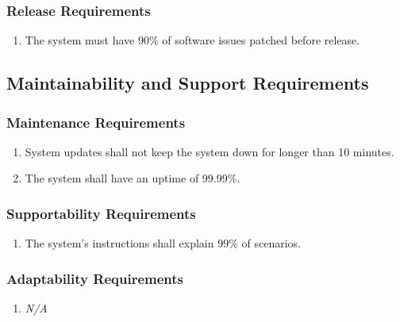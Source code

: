 \documentclass{article}
\begin{document}
\subsubsection{Release Requirements}
\label{ssub:release_requirements}
\begin{enumerate}[{OE}1. ]
	\item The system must have 90\% of software issues patched before release.
\end{enumerate}


\subsection{Maintainability and Support Requirements}
\label{sub:maintainability_and_support_requirements}

\subsubsection{Maintenance Requirements}
\label{ssub:maintenance_requirements}
\begin{enumerate}[{MS}1. ]
	\item System updates shall not keep the system down for longer than 10 minutes.
	\item The system shall have an uptime of 99.99\%.
\end{enumerate}

\subsubsection{Supportability Requirements}
\label{ssub:supportability_requirements}
\begin{enumerate}[{MS}1. ]
	\item The system's instructions shall explain 99\% of scenarios.
\end{enumerate}

\subsubsection{Adaptability Requirements}
\label{ssub:adaptability_requirements}
\begin{enumerate}[{MS}1. ]
	\item \emph{N/A}
\end{enumerate}
\end{document}
